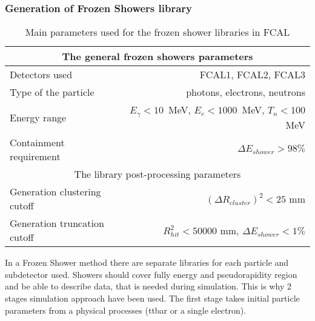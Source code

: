 \subsubsection{Generation of Frozen Showers library}

\begin{table}
\centering
\begin{tabular}{l|r}
\hline
\hline
\multicolumn{2}{c}{The general frozen showers parameters} \\
\hline
Detectors used            & FCAL1, FCAL2, FCAL3 \\
Type of the particle      & photons, electrons, neutrons \\
Energy range              &  $E_{\gamma}<10$~MeV,  $E_{e}<1000$~MeV,  $T_n<100$~MeV \\
Containment requirement   & $\Delta E_{shower} > 98\%$\\
\hline
\multicolumn{2}{c}{The library post-processing parameters} \\
\hline
Generation clustering cutoff & $(\Delta R_{cluster})^{2} < 25$ mm\\
Generation truncation cutoff & $R_{hit}^{2} < 50000$ mm, $\Delta E_{shower} < 1\%$\\
\hline
\hline
\end{tabular}
\caption{Main parameters used for the frozen shower libraries in FCAL }
\label{tab:MC_FS_params}
\end{table}

In a Frozen Shower method there are separate libraries for each particle and subdetector used. Showers should cover fully energy and pseudorapidity region and be able to describe data, that is needed during simulation. This is why 2 stages simulation approach have been used. The first stage takes initial particle parameters from a physical processes (ttbar or a single electron). 

